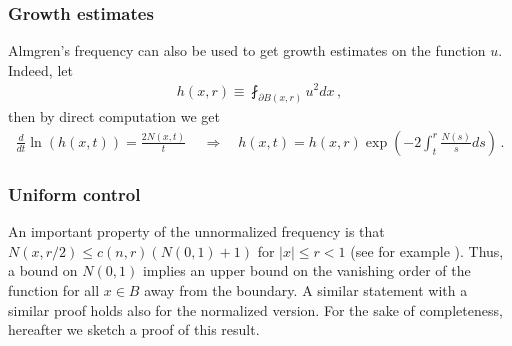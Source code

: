 \documentclass[11pt]{article}
\begin{document}
\subsubsection{Growth estimates} Almgren's frequency can also be used to get growth estimates on the function $u$. Indeed, let
\begin{gather}
 h(x,r)\equiv \fint_{\partial B(x,r)} u^2 dx\, ,
\end{gather}
then by direct computation we get
\begin{gather}\label{eq_doth}
 \frac{d}{dt}\ln(h(x,t)) = \frac{2N(x,t)}{t}\, \quad \Longrightarrow \quad h(x,t) = h(x,r) \exp{\left({-2\int_t^r \frac{N(s)}{s}ds}\right)}\, .
\end{gather}

\subsubsection{Uniform control} An important property of the unnormalized frequency is that $N(x,r/2)\leq c(n,r) (N(0,1)+1)$ for ${\left|x\right|}  \leq r <1$ (see for example \cite[theorem 2.2.8]{hanlin}). Thus, a bound on $N(0,1)$ implies an upper bound on the vanishing order of the function for all $x\in B$ away from the boundary. A similar statement with a similar proof holds also for the normalized version. For the sake of completeness, hereafter we sketch a proof of this result.
\end{document}
